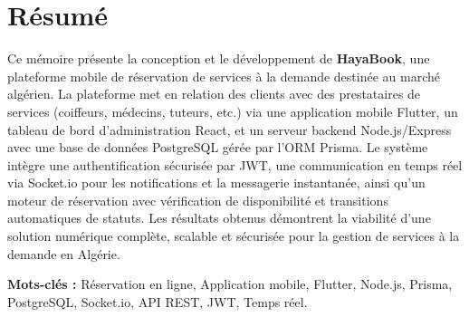 \chapter*{\hfill Résumé \hfill}

Ce mémoire présente la conception et le développement de \textbf{HayaBook}, une plateforme mobile de réservation de services à la demande destinée au marché algérien. La plateforme met en relation des clients avec des prestataires de services (coiffeurs, médecins, tuteurs, etc.) via une application mobile Flutter, un tableau de bord d'administration React, et un serveur backend Node.js/Express avec une base de données PostgreSQL gérée par l'ORM Prisma. Le système intègre une authentification sécurisée par JWT, une communication en temps réel via Socket.io pour les notifications et la messagerie instantanée, ainsi qu'un moteur de réservation avec vérification de disponibilité et transitions automatiques de statuts. Les résultats obtenus démontrent la viabilité d'une solution numérique complète, scalable et sécurisée pour la gestion de services à la demande en Algérie.

\textbf{Mots-clés :} Réservation en ligne, Application mobile, Flutter, Node.js, Prisma, PostgreSQL, Socket.io, API REST, JWT, Temps réel.

